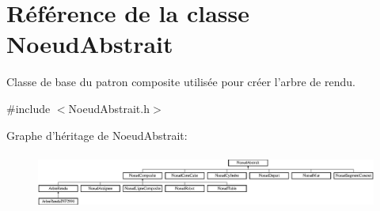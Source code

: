 \hypertarget{class_noeud_abstrait}{\section{Référence de la classe Noeud\-Abstrait}
\label{class_noeud_abstrait}
}


Classe de base du patron composite utilisée pour créer l'arbre de rendu.  




{\ttfamily \#include $<$Noeud\-Abstrait.\-h$>$}

Graphe d'héritage de Noeud\-Abstrait\-:\begin{figure}[H]
\begin{center}
\leavevmode
\includegraphics[height=1.866667cm]{class_noeud_abstrait}
\end{center}
\end{figure}
